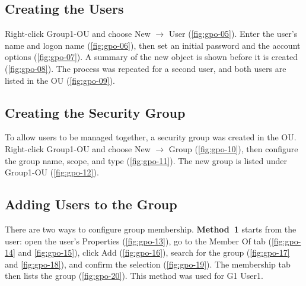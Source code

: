 \subsection{Creating the Users}
\label{sec:gpo-create-users}
Right-click Group1-OU and choose New $\rightarrow$ User (\autoref{fig:gpo-05}). Enter the user's name and logon name (\autoref{fig:gpo-06}), then set an initial password and the account options (\autoref{fig:gpo-07}). A summary of the new object is shown before it is created (\autoref{fig:gpo-08}). The process was repeated for a second user, and both users are listed in the OU (\autoref{fig:gpo-09}).


\subsection{Creating the Security Group}
\label{sec:gpo-create-group}
To allow users to be managed together, a security group was created in the OU. Right-click Group1-OU and choose New $\rightarrow$ Group (\autoref{fig:gpo-10}), then configure the group name, scope, and type (\autoref{fig:gpo-11}). The new group is listed under Group1-OU (\autoref{fig:gpo-12}).


\subsection{Adding Users to the Group}
\label{sec:gpo-add-users}
There are two ways to configure group membership. \textbf{Method~1} starts from the user: open the user's Properties (\autoref{fig:gpo-13}), go to the Member Of tab (\autoref{fig:gpo-14} and \autoref{fig:gpo-15}), click Add (\autoref{fig:gpo-16}), search for the group (\autoref{fig:gpo-17} and \autoref{fig:gpo-18}), and confirm the selection (\autoref{fig:gpo-19}). The membership tab then lists the group (\autoref{fig:gpo-20}). This method was used for G1 User1.

